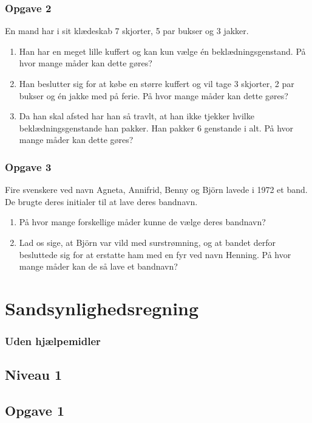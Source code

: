 \documentclass[12pt]{article}
\begin{document}
\subsubsection*{Opgave 2}
En mand har i sit klædeskab 7 skjorter, 5 par bukser og 3 jakker.
\begin{enumerate}[label=\roman*)]
	\item Han har en meget lille kuffert og kan kun vælge én beklædningsgenstand. På hvor mange måder kan dette gøres?
	\item Han beslutter sig for at købe en større kuffert og vil tage 3 skjorter, 2 par bukser og én jakke med på ferie. På hvor mange måder kan dette gøres?
	\item Da han skal afsted har han så travlt, at han ikke tjekker hvilke beklædningsgenstande han pakker. Han pakker 6 genstande i alt. På hvor mange måder kan dette gøres?
\end{enumerate}

\subsubsection*{Opgave 3}
Fire svenskere ved navn Agneta, Annifrid, Benny og Björn lavede i 1972 et band. De brugte deres initialer til at lave deres bandnavn.
\begin{enumerate}[label=\roman*)]
	\item På hvor mange forskellige måder kunne de vælge deres bandnavn?
	\item Lad os sige, at Björn var vild med surstrømning, og at bandet derfor besluttede sig for at erstatte ham med en fyr ved navn Henning. På hvor mange måder kan de så lave et bandnavn?
\end{enumerate}

\newpage

\section*{Sandsynlighedsregning}

\subsubsection*{Uden hjælpemidler}

\subsection*{Niveau 1}

\subsection*{Opgave 1}
\end{document}
